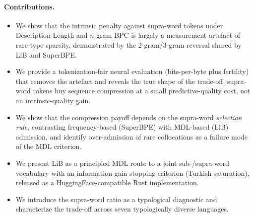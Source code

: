 \paragraph{Contributions.}
\begin{itemize}
  \item We show that the intrinsic penalty against supra-word tokens under
        Description Length and $n$-gram BPC is largely a measurement artefact of
        rare-type sparsity, demonstrated by the 2-gram/3-gram reversal shared by
        LiB and SuperBPE.
  \item We provide a tokenization-fair neural evaluation (bits-per-byte plus
        fertility) that removes the artefact and reveals the true shape of the
        trade-off: supra-word tokens buy sequence compression at a small
        predictive-quality cost, not an intrinsic-quality gain.
  \item We show that the compression payoff depends on the supra-word
        \emph{selection rule}, contrasting frequency-based (SuperBPE) with
        MDL-based (LiB) admission, and identify over-admission of rare
        collocations as a failure mode of the MDL criterion.
  \item We present LiB as a principled MDL route to a joint sub-/supra-word
        vocabulary with an information-gain stopping criterion (Turkish
        saturation), released as a HuggingFace-compatible Rust implementation.
  \item We introduce the supra-word ratio as a typological diagnostic and
        characterize the trade-off across seven typologically diverse languages.
\end{itemize}
